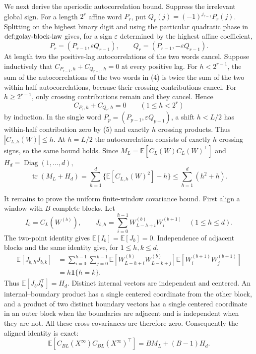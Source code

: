 We next derive the aperiodic autocorrelation bound.  Suppress the irrelevant global sign.  For a length \(2^r\) affine word \(P_r\), put \(Q_r(j)=(-1)^{j_{r-1}}P_r(j)\).  Splitting on the highest binary digit and using the particular quadratic phase in \(\textnormal{def:golay-block-law}\) gives, for a sign \(\varepsilon\) determined by the highest affine coefficient,
\[
P_r=(P_{r-1},\varepsilon Q_{r-1}),\qquad
Q_r=(P_{r-1},-\varepsilon Q_{r-1}). \tag{4}
\]
At length two the positive-lag autocorrelations of the two words cancel.  Suppose inductively that \(C_{P_{r-1},h}+C_{Q_{r-1},h}=0\) at every positive lag.  For \(h<2^{r-1}\), the sum of the autocorrelations of the two words in (4) is twice the sum of the two within-half autocorrelations, because their crossing contributions cancel.  For \(h\ge 2^{r-1}\), only crossing contributions remain and they cancel.  Hence
\[
C_{P_r,h}+C_{Q_r,h}=0\qquad(1\le h<2^r) \tag{5}
\]
by induction.  In the single word \(P_p=(P_{p-1},\varepsilon Q_{p-1})\), a shift \(h<L/2\) has within-half contribution zero by (5) and exactly \(h\) crossing products.  Thus \(|C_{L,h}(W)|\le h\).  At \(h=L/2\) the autocorrelation consists of exactly \(h\) crossing signs, so the same bound holds.  Since \(M_L=\mathbb E[C_L(W)C_L(W)^{\top}]\) and \(H_d=\operatorname{Diag}(1,\ldots,d)\),
\[
\operatorname{tr}(M_L+H_d)
=\sum_{h=1}^d\{\mathbb E[C_{L,h}(W)^2]+h\}
\le \sum_{h=1}^d(h^2+h). \tag{6}
\]

It remains to prove the uniform finite-window covariance bound.  First align a window with \(B\) complete blocks.  Let
\[
I_b=C_L(W^{(b)}),\qquad
J_{b,h}=\sum_{i=0}^{h-1}W^{(b)}_{L-h+i}W^{(b+1)}_i
\quad(1\le h\le d). \tag{7}
\]
The two-point identity gives \(\mathbb E[I_b]=\mathbb E[J_b]=0\).  Independence of adjacent blocks and the same identity give, for \(1\le h,k\le d\),
\[
\begin{aligned}
\mathbb E[J_{b,h}J_{b,k}]
&=\sum_{i=0}^{h-1}\sum_{j=0}^{k-1}
 \mathbb E[W^{(b)}_{L-h+i}W^{(b)}_{L-k+j}]
 \mathbb E[W^{(b+1)}_iW^{(b+1)}_j]\\
&=h\mathbf 1\{h=k\}. \tag{8}
\end{aligned}
\]
Thus \(\mathbb E[J_bJ_b^{\top}]=H_d\).  Distinct internal vectors are independent and centered.  An internal--boundary product has a single centered coordinate from the other block, and a product of two distinct boundary vectors has a single centered coordinate in an outer block when the boundaries are adjacent and is independent when they are not.  All these cross-covariances are therefore zero.  Consequently the aligned identity is exact:
\[
\mathbb E[C_{BL}(X^{\infty})C_{BL}(X^{\infty})^{\top}]
=BM_L+(B-1)H_d. \tag{9}
\]

